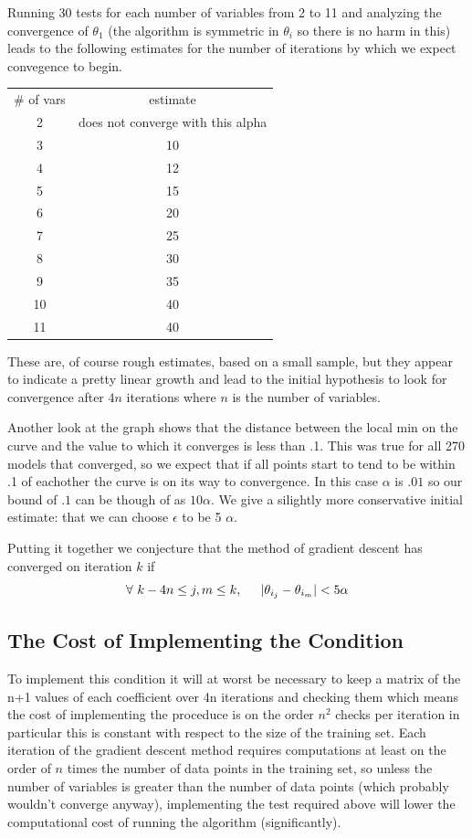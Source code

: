\documentclass[11pt]{article} %
\begin{document}
Running 30 tests for each number of variables from 2 to 11 and analyzing the convergence of $\theta_{1}$ (the algorithm is symmetric in $\theta_{i}$ so there is no harm in this) leads to the following estimates for the number of iterations by which we expect convegence to begin. 

\begin{tabular} {cc}
\# of vars & estimate \\
2 & does not converge with this alpha\\
3 &  10 \\
4 &  12 \\
5 &  15 \\
6 &  20 \\
7 &  25 \\
8 & 30 \\
9 & 35 \\
10 & 40\\
11 & 40

\end{tabular} 

These are, of course rough estimates, based on a small sample, but they appear to indicate a pretty linear growth and lead to the initial hypothesis to look for convergence after $4n$ iterations where $n$ is the number of variables. 

Another look at the graph shows that the distance between the local min on the curve and the value to which it converges is less than .1.  This was true for all 270 models that converged,
so we expect that if all points start to tend to be within .1 of eachother the curve is on its way to convergence.  In this case $\alpha$ is $.01$ so our bound of $.1$ can be though of as 
$10\alpha$.  We give a silightly more conservative initial estimate: that we can choose $\epsilon$ to be 5 $\alpha$. 

Putting it together we conjecture that the method of gradient descent has converged on iteration $k$ if 
$$\forall\ k - 4n \leq  j,m \leq k, \hspace{.2in} 
|\theta_{i_{j}} - \theta_{i_{m}}| < 5\alpha$$  

\subsection{The Cost of Implementing the Condition}
To implement this condition it will at worst be necessary to keep a matrix of the n+1 values of each coefficient over 4n iterations and checking them which means the cost of 
implementing the proceduce is on the order $n^2$ checks per iteration in particular this is constant with respect to the size of the training set. Each iteration of the gradient descent method requires computations at least on the order of $n$ times the number of data points in the training set, so unless the number of variables is greater than the number of data points (which probably wouldn't converge anyway), implementing the test required above will lower the computational cost of running the algorithm (significantly). 
\end{document}
